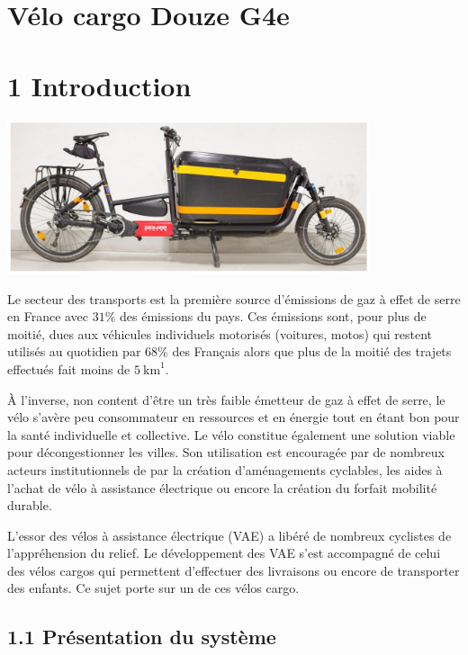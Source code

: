 \ifprof

\else


\section*{Vélo cargo Douze G4e}
\section*{1 Introduction}

\begin{center}
\includegraphics[width=0.8\textwidth]{images/2024_12_06_8b2ce2e701dae8972925g-01}
\end{center}


Le secteur des transports est la première source d'émissions de gaz à effet de serre en France avec \(31 \%\) des émissions du pays. Ces émissions sont, pour plus de moitié, dues aux véhicules individuels motorisés (voitures, motos) qui restent utilisés au quotidien par \(68 \%\) des Français alors que plus de la moitié des trajets effectués fait moins de \(5 \mathrm{~km}^{1}\).

À l'inverse, non content d'être un très faible émetteur de gaz à effet de serre, le vélo s'avère peu consommateur en ressources et en énergie tout en étant bon pour la santé individuelle et collective. Le vélo constitue également une solution viable pour décongestionner les villes. Son utilisation est encouragée par de nombreux acteurs institutionnels de par la création d'aménagements cyclables, les aides à l'achat de vélo à assistance électrique ou encore la création du forfait mobilité durable.

L'essor des vélos à assistance électrique (VAE) a libéré de nombreux cyclistes de l'appréhension du relief. Le développement des VAE s'est accompagné de celui des vélos cargos qui permettent d'effectuer des livraisons ou encore de transporter des enfants. Ce sujet porte sur un de ces vélos cargo.

\subsection*{1.1 Présentation du système}

